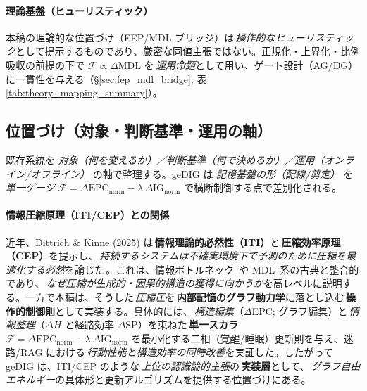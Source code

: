 \documentclass[ja=standard,xelatex]{bxjsarticle}
\newcommand{\F}{\mathcal{F}}
\newcommand{\gednorm}{\Delta\mathrm{EPC}_{\mathrm{norm}}}
\newcommand{\ignorm}{\Delta\mathrm{IG}_{\mathrm{norm}}}
\begin{document}
\paragraph{理論基盤（ヒューリスティック）}
本稿の理論的な位置づけ（FEP/MDL ブリッジ）は\,\emph{操作的なヒューリスティック}として提示するものであり、厳密な同値主張ではない。正規化・上界化・比例吸収の前提の下で $\F\propto\Delta\mathrm{MDL}$ を\,\emph{運用命題}として用い、ゲート設計（AG/DG）に一貫性を与える（\S\ref{sec:fep_mdl_bridge}, 表\ref{tab:theory_mapping_summary}）。



\subsection{位置づけ（対象・判断基準・運用の軸）}
\label{sec:positioning_axes}
既存系統を \emph{対象（何を変えるか）／判断基準（何で決めるか）／運用（オンライン/オフライン）} の軸で整理する。geDIG は \emph{記憶基盤の形（配線/剪定）} を \emph{単一ゲージ} $\F=\gednorm-\lambda\,\ignorm$ で横断制御する点で差別化される。

\paragraph{情報圧縮原理（ITI/CEP）との関係} 近年、Dittrich \& Kinne (2025) は\,\textbf{情報理論的必然性（ITI）}と\,\textbf{圧縮効率原理（CEP）}を提示し、\,\emph{持続するシステムは不確実環境下で予測のために圧縮を最適化する必然}を論じた\,\cite{DittrichKinne2025ITI}。これは、情報ボトルネック\,\cite{Tishby1999} や MDL\,\cite{rissanen1978} 系の古典と整合的であり、\,\emph{なぜ圧縮が生成的・因果的構造の獲得に向かうか}を高レベルに説明する。一方で本稿は、そうした\,\emph{圧縮圧}を\,\textbf{内部記憶のグラフ動力学}に落とし込む\,\textbf{操作的制御則}として実装する。具体的には、\,\emph{構造編集}（$\Delta$EPC; グラフ編集）と\,\emph{情報整理}（$\Delta H$ と経路効率 $\Delta\mathrm{SP}$）を束ねた\,\textbf{単一スカラ} $\F=\gednorm-\lambda\,\ignorm$ を最小化する二相（覚醒/睡眠）更新則を与え、迷路/RAG における\,\emph{行動性能と構造効率の同時改善}を実証した。したがって geDIG は、ITI/CEP のような\,\emph{上位の認識論的主張}の\,\textbf{実装層}として、\,\emph{グラフ自由エネルギー}の具体形と更新アルゴリズムを提供する位置づけにある。
\end{document}
